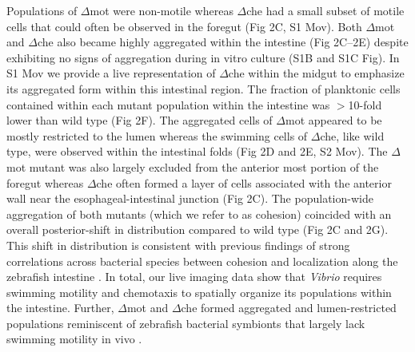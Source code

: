 {{Populations of $\Delta$mot were non-motile whereas $\Delta$che had a small subset of motile cells that could often be observed in the foregut (Fig 2C, S1 Mov). Both $\Delta$mot and $\Delta$che also became highly aggregated within the intestine (Fig 2C–2E) despite exhibiting no signs of aggregation during in vitro culture (S1B and S1C Fig). In S1 Mov we provide a live representation of $\Delta$che within the midgut to emphasize its aggregated form within this intestinal region. The fraction of planktonic cells contained within each mutant population within the intestine was $ > $10-fold lower than wild type (Fig 2F). The aggregated cells of $\Delta$mot appeared to be mostly restricted to the lumen whereas the swimming cells of $\Delta$che, like wild type, were observed within the intestinal folds (Fig 2D and 2E, S2 Mov). The $\Delta$mot mutant was also largely excluded from the anterior most portion of the foregut whereas $\Delta$che often formed a layer of cells associated with the anterior wall near the esophageal-intestinal junction (Fig 2C). The population-wide aggregation of both mutants (which we refer to as cohesion) coincided with an overall posterior-shift in distribution compared to wild type (Fig 2C and 2G). This shift in distribution is consistent with previous findings of strong correlations across bacterial species between cohesion and localization along the zebrafish intestine \cite{schlomann_bacterial_2018}. In total, our live imaging data show that \textit{Vibrio} requires swimming motility and chemotaxis to spatially organize its populations within the intestine. Further, $\Delta$mot and $\Delta$che formed aggregated and lumen-restricted populations reminiscent of zebrafish bacterial symbionts that largely lack swimming motility in vivo \cite{wiles_modernized_2018,schlomann_bacterial_2018}. 


}}
